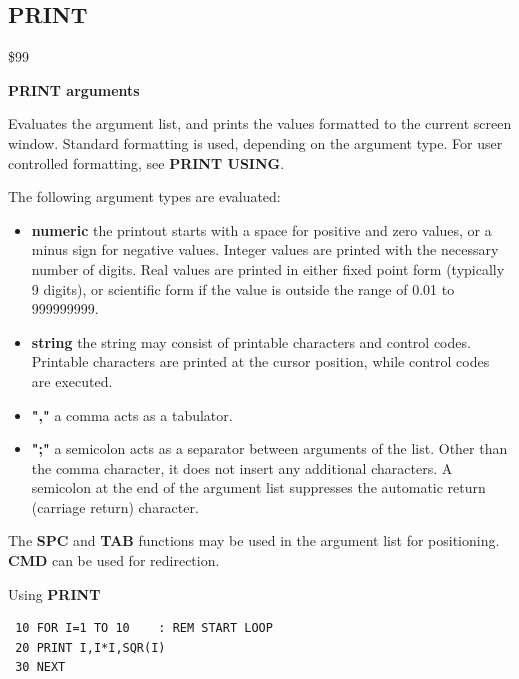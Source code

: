 \subsection{PRINT}
\begin{description}[leftmargin=2cm,style=nextline]
\item [Token:] \$99
\item [Format:] {\bf PRINT arguments}
\item [Usage:]  Evaluates the argument list, and prints the values
                formatted to the current screen window.
                Standard formatting is used, depending on the
                argument type. For user controlled formatting,
                see {\bf PRINT USING}.

                The following argument types are evaluated:
                \begin{itemize}
                    \item {\bf numeric} the printout starts with a space
                    for positive and zero values, or a minus sign for
                    negative values. Integer values are printed with
                    the necessary number of digits. Real values are
                    printed in either fixed point form (typically
                    9 digits), or scientific form if the value is
                    outside the range of 0.01 to 999999999.

                    \item {\bf string} the string may consist of printable
                    characters and control codes. Printable characters
                    are printed at the cursor position, while control
                    codes are executed.

                    \item {\bf ","} a comma acts as a tabulator.

                    \item {\bf ";"} a semicolon acts as a separator between
                    arguments of the list. Other than the comma character,
                    it does not insert any additional characters.
                    A semicolon at the end of the argument list suppresses
                    the automatic return (carriage return) character.
                \end{itemize}
\item [Remarks:] The {\bf SPC} and {\bf TAB} functions
                 may be used in the argument list
                 for positioning.
                 {\bf CMD} can be used for redirection.

\item [Example:] Using {\bf PRINT}

\begin{tcolorbox}[colback=black,coltext=white]
\verbatimfont{\codefont}
\begin{verbatim}
 10 FOR I=1 TO 10    : REM START LOOP
 20 PRINT I,I*I,SQR(I)
 30 NEXT
\end{verbatim}
\end{tcolorbox}
\end{description}


